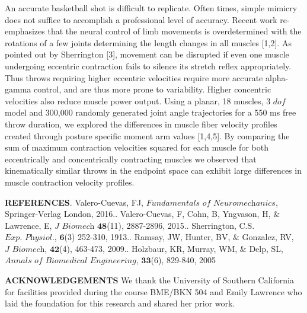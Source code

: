 \documentclass[12pt]{article}
\begin{document}
An accurate basketball shot is difficult to replicate. Often times, simple mimicry does not suffice to accomplish a professional level of accuracy. Recent work re-emphasizes that the neural control of limb movements is overdetermined with the rotations of a few joints determining the length changes in all muscles [1,2]. As pointed out by Sherrington [3], movement can be disrupted if even one muscle undergoing eccentric contraction fails to silence its stretch reflex appropriately. Thus throws requiring higher eccentric velocities require more accurate alpha-gamma control, and are thus more prone to variability. Higher concentric velocities also reduce muscle power output. Using a planar, 18 muscles, 3 $\textit{dof}$ model and 300,000 randomly generated joint angle trajectories for a 550 ms free throw duration, we explored the differences in muscle fiber velocity profiles created through posture specific moment arm values [1,4,5]. By comparing the sum of maximum contraction velocities squared for each muscle for both eccentrically and concentrically contracting muscles we observed that kinematically similar throws in the endpoint space can exhibit large differences in muscle contraction velocity profiles. 
\vspace{3mm}
\begin{flushleft}


\textbf{REFERENCES}. Valero-Cuevas, FJ, $\textit{Fundamentals of Neuromechanics}$, Springer-Verlag London, 2016.. Valero-Cuevas, F, Cohn, B, Yngvason, H, $\&$ Lawrence, E, $\textit{J Biomech}$ $\textbf{48}$(11), 2887-2896, 2015.. Sherrington, C.S. $\textit{Exp. Physiol.}$, $\textbf{6}$(3) 252-310, 1913.. Ramsay, JW, Hunter, BV, $\&$ Gonzalez, RV, $\textit{J Biomech}$, $\textbf{42}$(4), 463-473, 2009.. Holzbaur, KR, Murray, WM, $\&$ Delp, SL, $\textit{Annals of Biomedical Engineering}$, $\textbf{33}$(6), 829-840, 2005\break
\end{flushleft}


\textbf{ACKNOWLEDGEMENTS}\break
We thank the University of Southern California for facilities provided during the course BME/BKN 504 and Emily Lawrence who laid the foundation for this research and shared her prior work.
\end{document}
